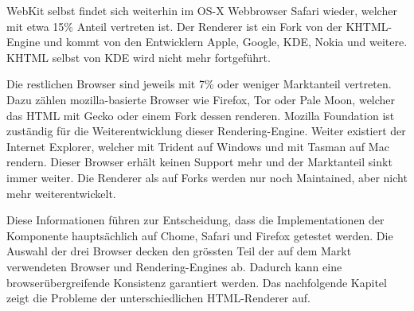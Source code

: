 WebKit selbst findet sich weiterhin im OS-X Webbrowser Safari wieder, welcher mit etwa 15\% Anteil vertreten ist.
Der Renderer ist ein Fork von der KHTML-Engine und kommt von den Entwicklern Apple, Google, KDE, Nokia und weitere. 
KHTML selbst von KDE wird nicht mehr fortgeführt.

Die restlichen Browser sind jeweils mit 7\% oder weniger Marktanteil vertreten.
Dazu zählen mozilla-basierte Browser wie Firefox, Tor oder Pale Moon, welcher das HTML mit Gecko oder einem Fork dessen renderen.
Mozilla Foundation ist zuständig für die Weiterentwicklung dieser Rendering-Engine.
Weiter existiert der Internet Explorer, welcher mit Trident auf Windows und mit Tasman auf Mac rendern.
Dieser Browser erhält keinen Support mehr und der Marktanteil sinkt immer weiter.
Die Renderer als auf Forks werden nur noch Maintained, aber nicht mehr weiterentwickelt.

Diese Informationen führen zur Entscheidung, dass die Implementationen der Komponente hauptsächlich auf Chome, Safari und Firefox getestet werden.
Die Auswahl der drei Browser decken den grössten Teil der auf dem Markt verwendeten Browser und Rendering-Engines ab.
Dadurch kann eine browserübergreifende Konsistenz garantiert werden.
Das nachfolgende Kapitel zeigt die Probleme der unterschiedlichen HTML-Renderer auf.
